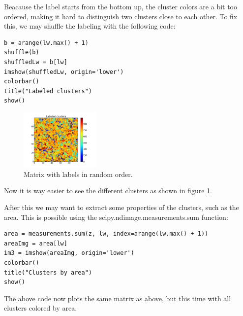 \documentclass[a4paper,reprint,floatfix,amsmath,amssymb,aps,pra]{revtex4-1}
\begin{document}
Beacause the label starts from the bottom up, the cluster colors are a bit too ordered, making it hard to distinguish two clusters close to each other. To fix this, we may shuffle the labeling with the following code:
%
\begin{lstlisting}
b = arange(lw.max() + 1)
shuffle(b)
shuffledLw = b[lw]
imshow(shuffledLw, origin='lower')
colorbar()
title("Labeled clusters")
show()
\end{lstlisting}
%
\begin{figure}
  \centering
  \includegraphics[width=0.35\textwidth]{./images/labeled-matrix.png}
  \caption{Matrix with labels in random order.}
  \label{fig:intro-better-labels}
\end{figure}
%
Now it is way easier to see the different clusters as shown in figure \ref{fig:intro-better-labels}.

After this we may want to extract some properties of the clusters, such as the area. This is possible using the scipy.ndimage.measurements.sum function:
%
\begin{lstlisting}
area = measurements.sum(z, lw, index=arange(lw.max() + 1))
areaImg = area[lw]
im3 = imshow(areaImg, origin='lower')
colorbar()
title("Clusters by area")
show()
\end{lstlisting}
%
The above code now plots the same matrix as above, but this time with all clusters colored by area.
\end{document}
